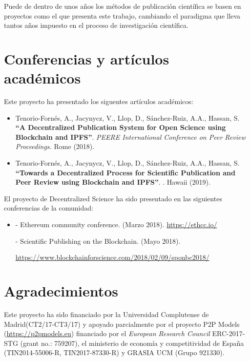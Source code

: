 Puede de dentro de unos años los métodos de publicación científica se basen en
proyectos como el que presenta este trabajo, cambiando el paradigma que lleva
tantos años impuesto en el proceso de investigación científica.


\section{Conferencias y artículos académicos}
\label{sec:conferences-papers}

Este proyecto ha presentado los siguentes artículos académicos:

\begin{itemize}
\item Tenorio-Fornés, A., Jacynycz, V., Llop, D., Sánchez-Ruiz, A.A., Hassan, S.
  \textbf{``A Decentralized Publication System for Open Science using Blockchain
    and IPFS''}. \emph{PEERE International Conference on Peer Review
    Proceedings.} Rome (2018).

\item Tenorio-Fornés, A., Jacynycz, V., Llop, D., Sánchez-Ruiz, A.A., Hassan, S.
  \textbf{``Towards a Decentralized Process for Scientific Publication and Peer
    Review using Blockchain and IPFS''}. . Hawaii (2019).
\end{itemize}
\clearpage
El proyecto de Decentralized Science ha sido presentado en las siguientes
conferencias de la comunidad:

\begin{itemize}
\item {} - Ethereum community conference.  (Marzo
  2018). \url{https://ethcc.io/}

   - Scientific Publishing on the Blockchain.  (Mayo 2018).
  
  
  \url{https://www.blockchainforscience.com/2018/02/09/sponbc2018/}
\end{itemize}

\section{Agradecimientos}

Este proyecto ha sido financiado por la Universidad Complutense de
Madrid(CT2/17-CT3/17) y apoyado parcialmente por el proyecto P2P Models
(\url{https://p2pmodels.eu}) financiado por el \emph{European Research Council}
ERC-2017-STG (grant no.: 759207), el ministerio de economía y competitividad de
España (TIN2014-55006-R, TIN2017-87330-R) y GRASIA UCM (Grupo 921330).



